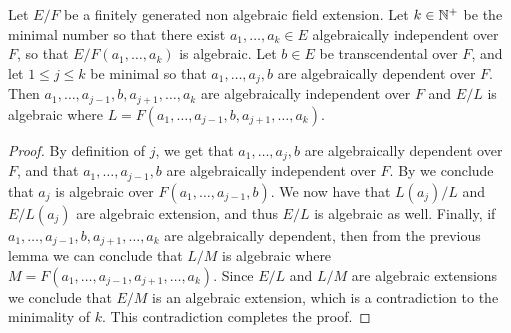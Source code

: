\documentclass[11pt,a4paper]{article}
\begin{document}
\begin{lemma}
  Let $E/F$ be a finitely generated non algebraic field extension.
  Let $k \in \mathbb{N}^+$ be the minimal number so that there exist
  $a_1,\dots,a_k \in E$ algebraically independent over $F$,
  so that $E/F(a_1,\dots,a_k)$ is algebraic.
  Let $b \in E$ be transcendental over $F$,
  and let $1 \le j \le k$ be minimal so that $a_1,\dots,a_j,b$
  are algebraically dependent over $F$.
  Then $a_1,\dots,a_{j-1},b,a_{j+1},\dots,a_k$ are algebraically
  independent over $F$
  and $E/L$ is algebraic where
  $L = F(a_1,\dots,a_{j-1},b,a_{j+1},\dots,a_k)$.
\end{lemma}
\begin{proof}
  By definition of $j$, we get that $a_1,\dots,a_j,b$
  are algebraically dependent over $F$,
  and that $a_1,\dots,a_{j-1},b$
  are algebraically independent over $F$.
  By  we conclude that
  $a_j$ is algebraic over $F(a_1,\dots,a_{j-1},b)$.
  We now have that $L(a_j)/L$ and $E/L(a_j)$
  are algebraic extension, and thus $E/L$ is algebraic as well.
  Finally, if $a_1,\dots,a_{j-1},b,a_{j+1},\dots,a_k$
  are algebraically dependent,
  then from the previous lemma we can conclude that
  $L/M$ is algebraic where $M = F(a_1,\dots,a_{j-1},a_{j+1},\dots,a_k)$.
  Since $E/L$ and $L/M$ are algebraic extensions we conclude that
  $E/M$ is an algebraic extension,
  which is a contradiction to the minimality of $k$.
  This contradiction completes the proof.
\end{proof}
\end{document}
